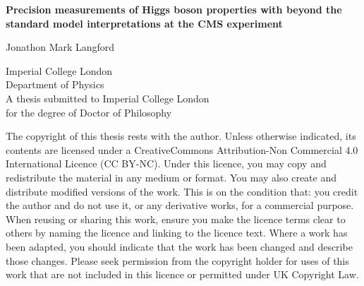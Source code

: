 \begin{titlepage}
    \begin{center}
        \vspace*{2cm}
        
        \huge{\textbf{Precision measurements of Higgs boson properties with beyond the standard model interpretations at the CMS experiment}}

        \vspace{1.5cm}
        \normalsize
        Jonathon Mark Langford
        
        \vspace{0.5cm}
        Imperial College London\\
        Department of Physics\\

        \vspace{5cm}
        A thesis submitted to Imperial College London\\
        for the degree of Doctor of Philosophy\\
        
    \end{center}
\end{titlepage}

The copyright of this thesis rests with the author. Unless otherwise indicated, its contents are licensed under a CreativeCommons Attribution-Non Commercial 4.0 International Licence (CC BY-NC). Under this licence, you may copy and redistribute the material in any medium or format. You may also create and distribute modified versions of the work. This is on the condition that: you credit the author and do not use it, or any derivative works, for a commercial purpose. When reusing or sharing this work, ensure you make the licence terms clear to others by naming the licence and linking to the licence text. Where a work has been adapted, you should indicate that the work has been changed and describe those changes. Please seek permission from the copyright holder for uses of this work that are not included in this licence or permitted under UK Copyright Law.
